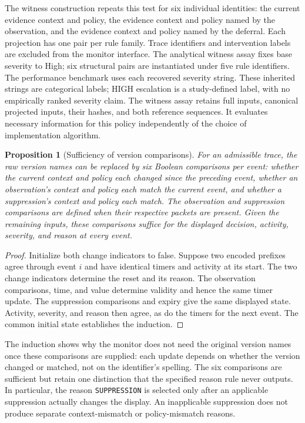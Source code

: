 \documentclass[preprint,11pt]{elsarticle}
\newtheorem{proposition}{Proposition}
\newcommand{\code}[1]{\texttt{#1}}
\begin{document}
The witness construction repeats this test for six individual identities: the current evidence context and policy, the evidence context and policy named by the observation, and the evidence context and policy named by the deferral. Each projection has one pair per rule family. Trace identifiers and intervention labels are excluded from the monitor interface. The analytical witness assay fixes base severity to High; six structural pairs are instantiated under five rule identifiers. The performance benchmark uses each recovered severity string. These inherited strings are categorical labels; HIGH escalation is a study-defined label, with no empirically ranked severity claim. The witness assay retains full inputs, canonical projected inputs, their hashes, and both reference sequences. It evaluates necessary information for this policy independently of the choice of implementation algorithm.

\begin{proposition}[Sufficiency of version comparisons]\label{prop:six-comparison}
For an admissible trace, the raw version names can be replaced by six Boolean comparisons per event: whether the current context and policy each changed since the preceding event, whether an observation's context and policy each match the current event, and whether a suppression's context and policy each match. The observation and suppression comparisons are defined when their respective packets are present. Given the remaining inputs, these comparisons suffice for the displayed decision, activity, severity, and reason at every event.
\end{proposition}
\begin{proof}
Initialize both change indicators to false. Suppose two encoded prefixes agree through event $i$ and have identical timers and activity at its start. The two change indicators determine the reset and its reason. The observation comparisons, time, and value determine validity and hence the same timer update. The suppression comparisons and expiry give the same displayed state. Activity, severity, and reason then agree, as do the timers for the next event. The common initial state establishes the induction.
\end{proof}
The induction shows why the monitor does not need the original version names once these comparisons are supplied: each update depends on whether the version changed or matched, not on the identifier's spelling. The six comparisons are sufficient but retain one distinction that the specified reason rule never outputs. In particular, the reason \code{SUPPRESSION} is selected only after an applicable suppression actually changes the display. An inapplicable suppression does not produce separate context-mismatch or policy-mismatch reasons.
\end{document}

